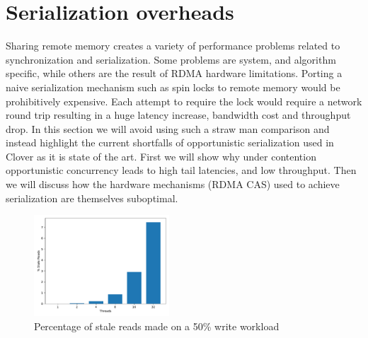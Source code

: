 \section{Serialization overheads}



Sharing remote memory creates a variety of performance problems related to
synchronization and serialization. Some problems are system, and algorithm
specific, while others are the result of RDMA hardware limitations.  Porting a
naive serialization mechanism such as spin locks to remote memory would be
prohibitively expensive. Each attempt to require the lock would require a
network round trip resulting in a huge latency increase, bandwidth cost and
throughput drop. In this section we will avoid using such a straw man comparison
and instead highlight the current shortfalls of opportunistic serialization used
in Clover as it is state of the art. First we will show why under contention
opportunistic concurrency leads to high tail latencies, and low throughput. Then
we will discuss how the hardware mechanisms (RDMA CAS) used to achieve
serialization are themselves suboptimal.


\begin{figure}[t]
    \includegraphics[width=0.45\textwidth]{fig/stale_reads.pdf}
    \caption{Percentage of stale reads made on a 50\% write workload }
    \label{fig:stale_reads}
\end{figure}

